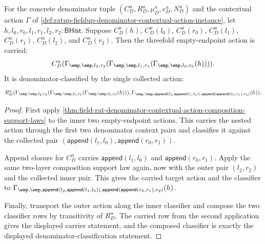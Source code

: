 \begin{theorem}
\label{thm:rat-denom-unit-contextual-action-nested-pair-action-coherence}
For the concrete denominator tuple
$(C_D^u,R_D^u,\mu_D^u,e_D^u,N_D^u)$ and the contextual action $\Gamma$ of
\autoref{def:ratup-fieldup-denominator-contextual-action-instance}, let
$h,l_0,r_0,l_1,r_1,l_2,r_2:\mathsf{BHist}$. Suppose
$C_D^u(h)$, $C_D^u(l_0)$, $C_D^u(r_0)$, $C_D^u(l_1)$, $C_D^u(r_1)$,
$C_D^u(l_2)$, and $C_D^u(r_2)$. Then the threefold empty-endpoint action is
carried:
$$
C_D^u(\Gamma_{\emp,\emp,l_2,r_2}(\Gamma_{\emp,\emp,l_1,r_1}(\Gamma_{\emp,\emp,l_0,r_0}(h)))).
$$
It is denominator-classified by the single collected action:
$$
R_D^u(\Gamma_{\emp,\emp,l_2,r_2}(\Gamma_{\emp,\emp,l_1,r_1}(\Gamma_{\emp,\emp,l_0,r_0}(h))),
\Gamma_{\emp,\emp,\mathsf{append}(l_2,\mathsf{append}(l_1,l_0)),\mathsf{append}(\mathsf{append}(r_0,r_1),r_2)}(h)).
$$
\end{theorem}
\begin{proof}
First apply
\autoref{thm:field-rat-denominator-contextual-action-composition-support-laws}
to the inner two empty-endpoint actions. This carries the nested action through
the first two denominator context pairs and classifies it against the collected
pair $(\mathsf{append}(l_1,l_0),\mathsf{append}(r_0,r_1))$.

Append closure for $C_D^u$ carries
$\mathsf{append}(l_1,l_0)$ and $\mathsf{append}(r_0,r_1)$. Apply the same
two-layer composition support law again, now with the outer pair $(l_2,r_2)$
and the collected inner pair. This gives the carried target action and the
classifier to
$\Gamma_{\emp,\emp,\mathsf{append}(l_2,\mathsf{append}(l_1,l_0)),\mathsf{append}(\mathsf{append}(r_0,r_1),r_2)}(h)$.

Finally, transport the outer action along the inner classifier and compose the
two classifier rows by transitivity of $R_D^u$. The carried row from the second
application gives the displayed carrier statement, and the composed classifier
is exactly the displayed denominator-classification statement.
\end{proof}

